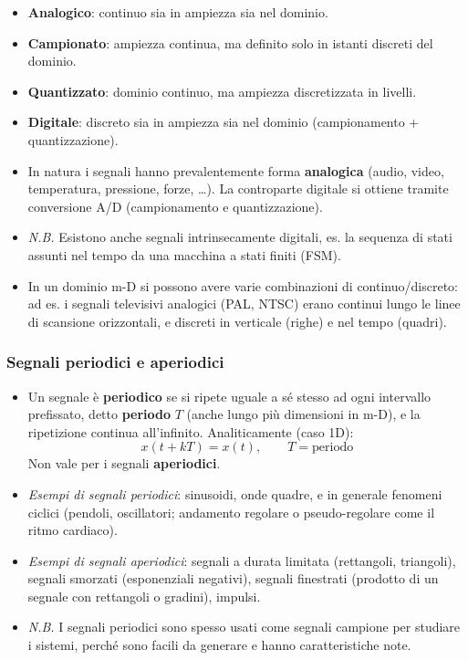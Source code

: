 \documentclass[12pt, a4paper]{article}
\begin{document}
\begin{itemize}
    \item \textbf{Analogico}: continuo sia in ampiezza sia nel dominio.
    \item \textbf{Campionato}: ampiezza continua, ma definito solo in istanti discreti del dominio.
    \item \textbf{Quantizzato}: dominio continuo, ma ampiezza discretizzata in livelli.
    \item \textbf{Digitale}: discreto sia in ampiezza sia nel dominio (campionamento + quantizzazione).
    \item In natura i segnali hanno prevalentemente forma \textbf{analogica} (audio, video, temperatura, pressione, forze, \dots). La controparte digitale si ottiene tramite conversione A/D (campionamento e quantizzazione).
    \item[] \textit{N.B.} Esistono anche segnali intrinsecamente digitali, es. la sequenza di stati assunti nel tempo da una macchina a stati finiti (FSM).
    \item In un dominio m-D si possono avere varie combinazioni di continuo/discreto: ad es. i segnali televisivi analogici (PAL, NTSC) erano continui lungo le linee di scansione orizzontali, e discreti in verticale (righe) e nel tempo (quadri).
\end{itemize}

\subsubsection{Segnali periodici e aperiodici}
\begin{itemize}
    \item Un segnale è \textbf{periodico} se si ripete uguale a sé stesso ad ogni intervallo prefissato, detto \textbf{periodo} $T$ (anche lungo più dimensioni in m-D), e la ripetizione continua all'infinito. Analiticamente (caso 1D):
    $$x(t+kT) = x(t), \qquad T = \text{periodo}$$
    Non vale per i segnali \textbf{aperiodici}.
    \item \textit{Esempi di segnali periodici}: sinusoidi, onde quadre, e in generale fenomeni ciclici (pendoli, oscillatori; andamento regolare o pseudo-regolare come il ritmo cardiaco).
    \item \textit{Esempi di segnali aperiodici}: segnali a durata limitata (rettangoli, triangoli), segnali smorzati (esponenziali negativi), segnali finestrati (prodotto di un segnale con rettangoli o gradini), impulsi.
    \item[] \textit{N.B.} I segnali periodici sono spesso usati come segnali campione per studiare i sistemi, perché sono facili da generare e hanno caratteristiche note.
\end{itemize}
\end{document}
